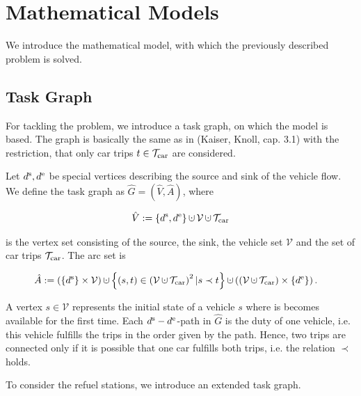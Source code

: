 \section{Mathematical Models}

We introduce the mathematical model, with which the previously described problem is solved.

\subsection{Task Graph}

For tackling the problem, we introduce a task graph, on which the model is based. The graph is basically the same as in (Kaiser, Knoll, cap. 3.1) with the restriction, that only car trips $t\in\mathcal{T}_{\operatorname{car}}$ are considered.

\begin{definition}

Let $d^{\operatorname{s}},d^{\operatorname{e}}$ be special vertices describing the source and sink of the vehicle flow. We define the task graph as $\hat{G}=(\hat{V},\hat{A})$, where

\begin{align*}
	\hat{V}:=\left\{\ds,\de\right\}\cupdot\mathcal{V}\cupdot\Tcar
\end{align*}

is the vertex set consisting of the source, the sink, the vehicle set $\mathcal{V}$ and the set of car trips $\mathcal{T}_{\operatorname{car}}$. The arc set is

\begin{align*}
	\hat{A} & :=\left(\left\{\ds\right\}\times\mathcal{V}\right)\cupdot\left\{(s,t)\in\left(\mathcal{V}\cupdot\Tcar\right)^2|s\prec t\right\}\cupdot\left(\left(\mathcal{V}\cupdot\Tcar\right)\times\left\{\de\right\}\right).
\end{align*}

\end{definition}

A vertex $s\in\mathcal{V}$ represents the initial state of a vehicle $s$ where is becomes available for the first time. Each $d^{\operatorname{s}} -d^{\operatorname{e}}$-path in $\hat{G}$ is the duty of one vehicle, i.e. this vehicle fulfills the trips in the order given by the path. Hence, two trips are connected only if it is possible that one car fulfills both trips, i.e. the relation $\prec$ holds.

To consider the refuel stations, we introduce an extended task graph.

